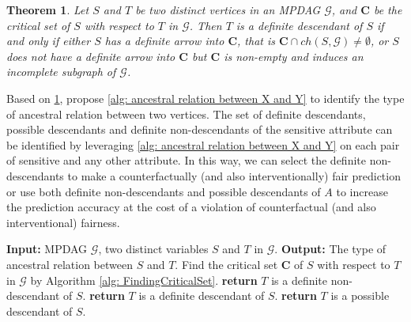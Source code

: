 \documentclass{article} %
\newtheorem{theorem}{Theorem}[section]
\begin{document}
\begin{theorem}\citep[Theorem 4.5]{zuo2022counterfactual}\label{theo}
    Let $S$ and $T$ be two distinct vertices in an MPDAG $\mathcal G$, and $\mathbf{C}$ be the critical set of $S$ with respect to $T$ in $\mathcal G$. Then $T$ is a definite descendant of $S$ if and only if either $S$ has a definite arrow into $\mathbf{C}$, that is $\mathbf{C} \cap{ch(S, \mathcal G)} \ne \emptyset$, or $S$ does not have a definite arrow into $\mathbf{C}$ but $\mathbf{C}$ is non-empty and induces an incomplete subgraph of $\mathcal{G}$.
\end{theorem}

Based on \cref{theo}, \citet{zuo2022counterfactual} propose \cref{alg: ancestral relation between X and Y} to identify the type of ancestral relation between two vertices. The set of definite descendants, possible descendants and definite non-descendants of the sensitive attribute can be identified by leveraging \cref{alg: ancestral relation between X and Y} on each pair of sensitive and any other attribute. In this way, we can select the definite non-descendants to make a counterfactually (and also interventionally) fair prediction or use both definite non-descendants and possible descendants of $A$ to increase the prediction accuracy at the cost of a violation of counterfactual (and also interventional) fairness.


\begin{algorithm}
\begin{algorithmic}[1]
\caption{Identify the type of ancestral relation of $S$ with respect to $T$ in an MPDAG \cite[Algorithm 2]{zuo2022counterfactual}}
\label{alg: ancestral relation between X and Y}
\State \textbf{Input:} MPDAG $\mathcal{G}$, two distinct variables $S$ and $T$ in $\mathcal{G}$.
\State \textbf{Output:} The type of ancestral relation between $S$ and $T$.
\State Find the critical set $\mathbf{C}$ of $S$ with respect to $T$ in $\mathcal{G}$ by Algorithm \ref{alg: FindingCriticalSet}.
    \State \textbf{return} $T$ is a definite non-descendant of $S$.
\EndIf
{}
    \State \textbf{return} $T$ is a definite descendant of $S$.
\EndIf
\State \textbf{return} $T$ is a possible descendant of $S$.
\end{algorithmic}
\end{algorithm}
\end{document}
